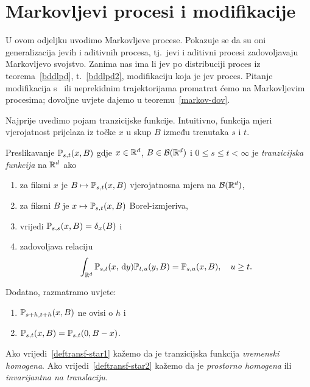 \documentclass[main.tex]{subfiles}
\begin{document}
\nocite{*}

\section{Markovljevi procesi i modifikacije} \label{sec:sp-markov}
U ovom odjeljku uvodimo Markovljeve procese. Pokazuje se da
su oni generalizacija \levy jevih i aditivnih procesa, tj.\ \levy jevi
i aditivni procesi zadovoljavaju Markovljevo svojstvo. Zanima nas ima
li \levy jev po distribuciji proces iz teorema~\ref{bddlpd}, t.~\ref{bddlpd2}, modifikaciju koja je \levy jev proces. Pitanje modifikacija
s \cadlag \ ili neprekidnim trajektorijama promatrat ćemo na Markovljevim procesima; dovoljne uvjete
dajemo u teoremu~\ref{markov-dov}.

Najprije uvedimo pojam tranzicijske funkcije. Intuitivno, funkcija mjeri
vjerojatnost prijelaza iz točke \( x \) u skup \( B \) između trenutaka \( s \) i \( t \).
\begin{definicija} \label{def:transf}
	Preslikavanje \( \mathbb{P}_{s, t}(x, B) \) gdje \( x \in \mathbb{R}^d \), \( B \in \mathcal B(\mathbb{R}^d) \)
	i \( 0 \le s \le t < \infty \) je \emph{tranzicijska funkcija} na \( \mathbb{R}^d \) ako
	\begin{enumerate}[label=(\roman*)]
		\item za fiksni \( x \) je \( B \mapsto \mathbb{P}_{s,t}(x, B) \) vjerojatnosna mjera na \( \mathcal B(\mathbb{R}^d) \),
		\item za fiksni \( B \) je \( x \mapsto \mathbb{P}_{s, t}(x, B) \) Borel-izmjeriva,
		\item vrijedi \( \mathbb{P}_{s,s}(x, B) = \delta_x(B) \) i
		\item zadovoljava relaciju
		      \begin{equation} \label{eq:chapkolm}
			      \int_{\mathbb{R}^d} \mathbb{P}_{s, t}(x, \,\mathrm d y) \mathbb{P}_{t, u} (y, B) = \mathbb{P}_{s, u}(x, B), \quad u \ge t.
		      \end{equation}
	\end{enumerate}
	Dodatno, razmatramo uvjete:
	\begin{enumerate}[label=(\roman*), resume]
		\item \( \mathbb{P}_{s+h, t+h}(x, B) \) ne ovisi o \( h \) i  \label{deftransf-star1}
		\item \( \mathbb{P}_{s, t}(x, B) = \mathbb{P}_{s,t}(0, B-x) \). \label{deftransf-star2}
	\end{enumerate}
	Ako vrijedi~\ref{deftransf-star1} kažemo da je tranzicijska funkcija \emph{vremenski homogena}.
	Ako vrijedi~\ref{deftransf-star2} kažemo da je \emph{prostorno homogena} ili \emph{invarijantna na translaciju}.
\end{definicija}
\end{document}

